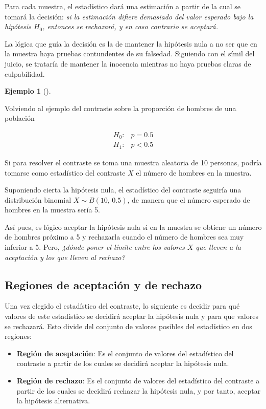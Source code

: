 \documentclass[
  spanish,
  a4paper,
]{scrreport}
\theoremstyle{plain}
\theoremstyle{definition}
\newtheorem{example}{Ejemplo}[chapter]
\theoremstyle{definition}
\theoremstyle{remark}
\begin{document}
Para cada muestra, el estadístico dará una estimación a partir de la
cual se tomará la decisión: \emph{si la estimación difiere demasiado del
valor esperado bajo la hipótesis \(H_0\), entonces se rechazará, y en
caso contrario se aceptará.}

La lógica que guía la decisión es la de mantener la hipótesis nula a no
ser que en la muestra haya pruebas contundentes de su falsedad.
Siguiendo con el símil del juicio, se trataría de mantener la inocencia
mientras no haya pruebas claras de culpabilidad.

\begin{example}[]\protect\hypertarget{exm-estadistico-contraste}{}\label{exm-estadistico-contraste}

Volviendo al ejemplo del contraste sobre la proporción de hombres de una
población

\begin{align*}
H_0: & p=0.5 \\
H_1: & p<0.5
\end{align*}

Si para resolver el contraste se toma una muestra aleatoria de 10
personas, podría tomarse como estadístico del contraste \(X\) el número
de hombres en la muestra.

Suponiendo cierta la hipótesis nula, el estadístico del contraste
seguiría una distribución binomial \(X\sim B(10,\,0.5)\), de manera que
el número esperado de hombres en la muestra sería 5.

Así pues, es lógico aceptar la hipótesis nula si en la muestra se
obtiene un número de hombres próximo a 5 y rechazarla cuando el número
de hombres sea muy inferior a 5. Pero, \emph{¿dónde poner el límite
entre los valores \(X\) que lleven a la aceptación y los que lleven al
rechazo?}

\end{example}

\subsection{Regiones de aceptación y de
rechazo}\label{regiones-de-aceptaciuxf3n-y-de-rechazo}

Una vez elegido el estadístico del contraste, lo siguiente es decidir
para qué valores de este estadístico se decidirá aceptar la hipótesis
nula y para que valores se rechazará. Esto divide del conjunto de
valores posibles del estadístico en dos regiones:

\begin{itemize}
\item
  \textbf{Región de aceptación}: Es el conjunto de valores del
  estadístico del contraste a partir de los cuales se decidirá aceptar
  la hipótesis nula.
\item
  \textbf{Región de rechazo}: Es el conjunto de valores del estadístico
  del contraste a partir de los cuales se decidirá rechazar la hipótesis
  nula, y por tanto, aceptar la hipótesis alternativa.
\end{itemize}
\end{document}
